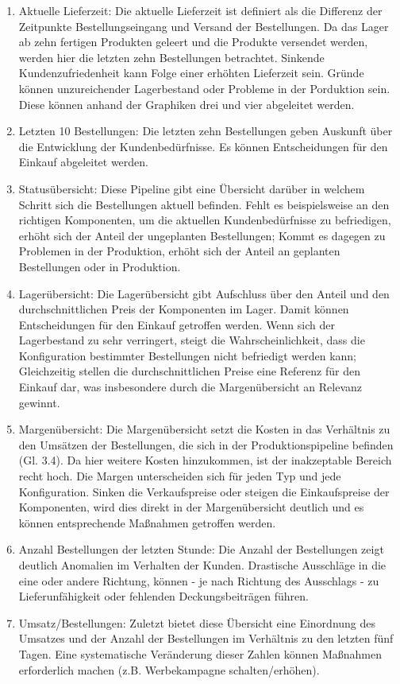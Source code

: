 \begin{enumerate}
    \item Aktuelle Lieferzeit: Die aktuelle Lieferzeit ist definiert als die Differenz der Zeitpunkte Bestellungseingang und Versand der Bestellungen. Da das Lager ab zehn fertigen Produkten geleert und die Produkte versendet werden, werden hier die letzten zehn Bestellungen betrachtet. Sinkende Kundenzufriedenheit kann Folge einer erhöhten Lieferzeit sein. Gründe können unzureichender Lagerbestand oder Probleme in der Porduktion sein. Diese können anhand der Graphiken drei und vier abgeleitet werden.
    \item Letzten 10 Bestellungen: Die letzten zehn Bestellungen geben Auskunft über die Entwicklung der Kundenbedürfnisse. Es können Entscheidungen für den Einkauf abgeleitet werden.
    \item Statusübersicht: Diese Pipeline gibt eine Übersicht darüber in welchem Schritt sich die Bestellungen aktuell befinden. Fehlt es beispielsweise an den richtigen Komponenten, um die aktuellen Kundenbedürfnisse zu befriedigen, erhöht sich der Anteil der ungeplanten Bestellungen; Kommt es dagegen zu Problemen in der Produktion, erhöht sich der Anteil an geplanten Bestellungen oder in Produktion.
    \item Lagerübersicht: Die Lagerübersicht gibt Aufschluss über den Anteil und den durchschnittlichen Preis der Komponenten im Lager. Damit können Entscheidungen für den Einkauf getroffen werden. Wenn sich der Lagerbestand zu sehr verringert, steigt die Wahrscheinlichkeit, dass die Konfiguration bestimmter Bestellungen nicht befriedigt werden kann; Gleichzeitig stellen die durchschnittlichen Preise eine Referenz für den Einkauf dar, was insbesondere durch die Margenübersicht an Relevanz gewinnt.
    \item Margenübersicht: Die Margenübersicht setzt die Kosten in das Verhältnis zu den Umsätzen der Bestellungen, die sich in der Produktionspipeline befinden (Gl. 3.4). Da hier weitere Kosten hinzukommen, ist der inakzeptable Bereich recht hoch. Die Margen unterscheiden sich für jeden Typ und jede Konfiguration. Sinken die Verkaufspreise oder steigen die Einkaufspreise der Komponenten, wird dies direkt in der Margenübersicht deutlich und es können entsprechende Maßnahmen getroffen werden.
    \item Anzahl Bestellungen der letzten Stunde: Die Anzahl der Bestellungen zeigt deutlich Anomalien im Verhalten der Kunden. Drastische Ausschläge in die eine oder andere Richtung, können - je nach Richtung des Ausschlags - zu Lieferunfähigkeit oder fehlenden Deckungsbeiträgen führen.
    \item Umsatz/Bestellungen: Zuletzt bietet diese Übersicht eine Einordnung des Umsatzes und der Anzahl der Bestellungen im Verhältnis zu den letzten fünf Tagen. Eine systematische Veränderung dieser Zahlen können Maßnahmen erforderlich machen (z.B. Werbekampagne schalten/erhöhen).
\end{enumerate}

